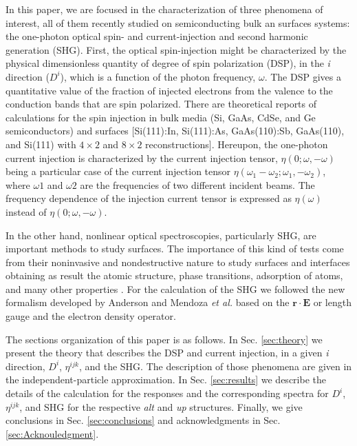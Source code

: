 \documentclass[twocolumn,aps,pra,11pt,tightenlines,showpacs,superscriptaddress,groupedaddress]{revtex4-1}
\begin{document}
In this paper, we are focused in the characterization of three phenomena of interest, all of them recently studied on semiconducting bulk an surfaces systems: the one-photon optical spin- and current-injection and  second harmonic generation (SHG). First, the optical spin-injection might be characterized by the physical dimensionless quantity of degree of spin polarization (DSP), in the \emph{i} direction ($D^{i}$), which is a function of the photon frequency, $\omega$. The DSP gives a quantitative value of the fraction of injected electrons from the valence to the conduction bands that are spin polarized. There are theoretical reports of calculations for the spin injection in bulk media  (Si, GaAs, CdSe, and Ge semiconductors) \cite{nastos2007full,cabellos2009stress,rioux2010optical} and surfaces  [Si(111):In, Si(111):As, GaAs(110):Sb, GaAs(110), and Si(111) with $4\times2$ and $8\times2$ reconstructions]\cite{mendoza2012optical,arzate2014optical}. Hereupon, the one-photon current injection is characterized by the current injection tensor, $\eta(0;\omega,-\omega)$  being a particular case of the current injection tensor $\eta(\omega_{1}-\omega_{2};\omega_{1},-\omega_{2})$, where $\omega{1}$ and $\omega{2}$ are the frequencies of two different incident beams. The frequency dependence of the injection current tensor is expressed as $\eta(\omega)$ instead of $\eta(0;\omega,-\omega)$.

In the other hand, nonlinear optical spectroscopies, particularly SHG, are important methods to study surfaces. The importance of this kind of tests come from their noninvasive and nondestructive nature to study surfaces and interfaces obtaining as result the atomic structure, phase transitions, adsorption of atoms, and many other properties \cite{dadap1997second,daum1993identification,mcgilp1994probing,power1995resonant,godefroy1996electric,salazar2014molecular,chen1981surface,mendoza1998microscopic}. For the calculation of the SHG we followed the new formalism developed by Anderson and Mendoza \emph{et al.}  \cite{anderson2015theory} based on the $\mathbf{r}\cdot\mathbf{E} $ or length gauge and the electron density operator.



The sections organization of this paper is as follows. In Sec. \ref{sec:theory} we present the theory that describes the DSP and current injection, in a given \emph{i} direction, $D^{i}$, $\eta^{ijk}$, and the SHG. The description of those phenomena are given in the independent-particle approximation. In Sec. \ref{sec:results} we describe the details of the calculation for the responses and the corresponding spectra for  $D^{i}$, $\eta^{ijk}$, and SHG for the respective \emph{alt} and \emph{up} structures. Finally, we give conclusions in Sec. \ref{sec:conclusions} and acknowledgments in Sec. \ref{sec:Acknouledgment}.
\end{document}

